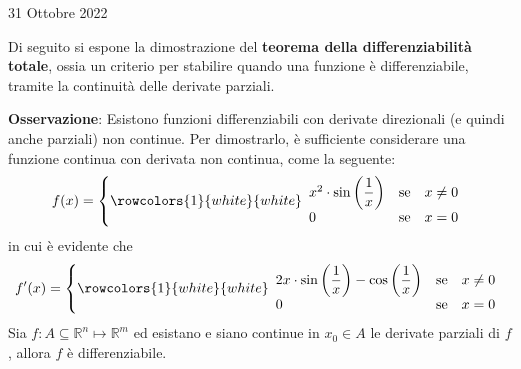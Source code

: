 \documentclass[a4paper]{extarticle}
\begin{document}
\newpage
\noindent
\begin{center}
    31 Ottobre 2022
\end{center}
Di seguito si espone la dimostrazione del \textbf{teorema della differenziabilità totale}, ossia un criterio per stabilire quando una funzione è differenziabile, tramite la continuità delle derivate parziali.

\vspace{2em}
\noindent
\textbf{Osservazione}: Esistono funzioni differenziabili con derivate direzionali (e quindi anche parziali) non continue. Per dimostrarlo, è sufficiente considerare una funzione continua con derivata non continua, come la seguente:
\[
    f(x)=\left\{
        \rowcolors{1}{white}{white}    
        \begin{array}{lll}
            x^2 \cdot \sin \left(\dfrac{1}{x}\right) & \text{se} & x \neq 0\\
            0   & \text{se} & x = 0\\
        \end{array}
    \right.
\]
in cui è evidente che
\[
    f'(x)=\left\{
        \rowcolors{1}{white}{white}    
        \begin{array}{lll}
            2x \cdot \sin \left(\dfrac{1}{x}\right) - \cos\left(\dfrac{1}{x}\right) & \text{se} & x \neq 0\\
            0   & \text{se} & x = 0\\
        \end{array}
    \right.
\]
Sia $f : A \subseteq \mathbb{R}^n \longmapsto \mathbb{R}^m$ ed esistano e siano continue in $x_0 \in A$ le derivate parziali di $f$, allora $f$ è differenziabile.
\end{document}
